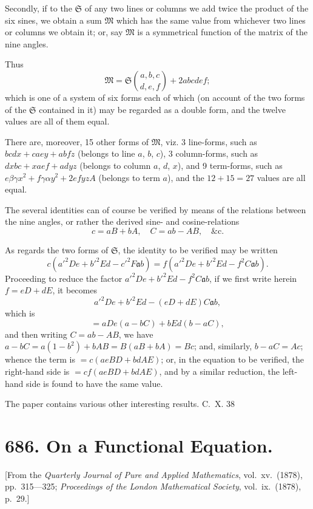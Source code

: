 \documentclass[12pt,a4paper]{article}
\theoremstyle{cayley}
\theoremstyle{definition}
\numberwithin{equation}{section}
\begin{document}
Secondly, if to the $\mathfrak{S}$ of any two lines or columns we add twice the product of the six sines, we obtain a sum $\mathfrak{M}$ which has the same value from whichever two lines or columns we obtain it; or, say $\mathfrak{M}$ is a symmetrical function of the matrix of the nine angles.

Thus
\[
\mathfrak{M} = \mathfrak{S}\binom{a,b,c}{d,e,f} + 2abcdef;
\]
which is one of a system of six forms each of which (on account of the two forms of the $\mathfrak{S}$ contained in it) may be regarded as a double form, and the twelve values are all of them equal.

There are, moreover, 15 other forms of $\mathfrak{M}$, viz. 3 line-forms, such as $bcdx + caey + abfz$ (belongs to line $a$, $b$, $c$), 3 column-forms, such as $dxbc + xaef + adyz$ (belongs to column $a$, $d$, $x$), and 9 term-forms, such as $e\beta\gamma x^2 + f\gamma\alpha y^2 + 2efyz A$ (belongs to term $a$), and the $12 + 15 = 27$ values are all equal.

The several identities can of course be verified by means of the relations between the nine angles, or rather the derived sine- and cosine-relations
\[
c = aB + bA, \quad C = ab - AB, \quad \text{\&c.}
\]

As regards the two forms of $\mathfrak{S}$, the identity to be verified may be written
\[
c(a'^2 De + b'^2 Ed - c'^2 F\mathfrak{a}b) = f(a'^2 De + b'^2 Ed - f^2 C\mathfrak{a}b).
\]
Proceeding to reduce the factor $a'^2 De + b'^2 Ed - f^2 C\mathfrak{a}b$, if we first write herein $f = eD + dE$, it becomes
\[
a'^2 De + b'^2 Ed - (eD + dE)C\mathfrak{a}b,
\]
which is
\[
= aDe(a - bC) + bEd(b - aC),
\]
and then writing $C = ab - AB$, we have $a - bC = a(1 - b^2) + bAB = B(aB + bA) = Bc$; and, similarly, $b - aC = Ac$; whence the term is $= c(aeBD + bdAE)$; or, in the equation to be verified, the right-hand side is $= cf(aeBD + bdAE)$, and by a similar reduction, the left-hand side is found to have the same value.

The paper contains various other interesting results.
\hfill C.~X. 38

\newpage

\section*{686. On a Functional Equation.}

[From the \textit{Quarterly Journal of Pure and Applied Mathematics}, vol.\ xv.\ (1878), pp.\ 315---325; \textit{Proceedings of the London Mathematical Society}, vol.\ ix.\ (1878), p.\ 29.]
\end{document}
